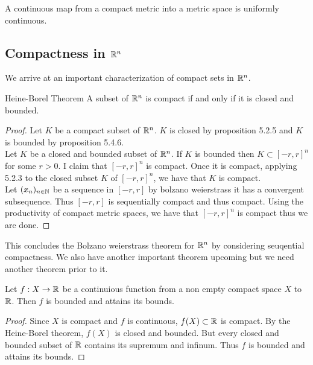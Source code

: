 \documentclass[a4paper]{article}
\begin{document}
\begin{thm}{}{} A continuous map from a compact metric into a metric space is uniformly continuous. 
\end{thm}

\subsection{Compactness in $\mathbb{R}^n$}
We arrive at an important characterization of compact sets in $\mathbb{R}^n$. 
\begin{thm}{Heine-Borel Theorem}{} A subset of $\mathbb{R}^n$ is compact if and only if it is closed and bounded. 
\begin{proof}
Let $K$ be a compact subset of $\mathbb{R}^n$. $K$ is closed by proposition 5.2.5 and $K$ is bounded by proposition 5.4.6. \\
Let $K$ be a closed and bounded subset of $\mathbb{R}^n$. If $K$ is bounded then $K\subset[-r,r]^n$ for some $r>0$. I claim that $[-r,r]^n$ is compact. Once it is compact, applying 5.2.3 to the closed subset $K$ of $[-r,r]^n$, we have that $K$ is compact. \\
Let $(x_n)_{n\in\mathbb{N}}$ be a sequence in $[-r,r]$ by bolzano weierstrass it has a convergent subsequence. Thus $[-r,r]$ is sequentially compact and thus compact. Using the productivity of compact metric spaces, we have that $[-r,r]^n$ is compact thus we are done. 
\end{proof}
\end{thm}

This concludes the Bolzano weierstrass theorem for $\mathbb{R}^n$ by considering seuqential compactness. We also have another important theorem upcoming but we need another theorem prior to it. 

\begin{thm}{}{} Let $f:X\to\mathbb{R}$ be a continuious function from a non empty compact space $X$ to $\mathbb{R}$. Then $f$ is bounded and attains its bounds. 
\begin{proof}
Since $X$ is compact and $f$ is continuous, $f(X)\subset\mathbb{R}$ is compact. By the Heine-Borel theorem, $f(X)$ is closed and bounded. But every closed and bounded subset of $\mathbb{R}$ contains its supremum and infinum. Thus $f$ is bounded and attains its bounds. 
\end{proof}
\end{thm}
\end{document}

